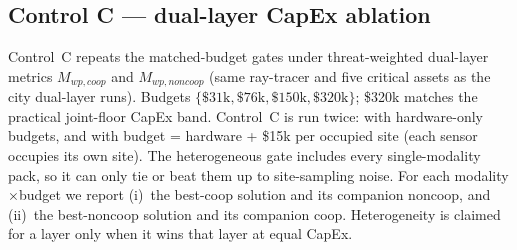 \subsection{Control C --- dual-layer CapEx ablation}
\label{sec:protocol_dual_ablation}

Control~C repeats the matched-budget gates under threat-weighted dual-layer metrics \(M_{wp,coop}\) and \(M_{wp,noncoop}\) (same ray-tracer and five critical assets as the city dual-layer runs). Budgets \(\{\$31\mathrm{k},\$76\mathrm{k},\$150\mathrm{k},\$320\mathrm{k}\}\); \$320k matches the practical joint-floor CapEx band. Control~C is run twice: with hardware-only budgets, and with budget = hardware + \$15k per occupied site (each sensor occupies its own site). The heterogeneous gate includes every single-modality pack, so it can only tie or beat them up to site-sampling noise. For each modality$\times$budget we report (i)~the best-coop solution and its companion noncoop, and (ii)~the best-noncoop solution and its companion coop. Heterogeneity is claimed for a layer only when it wins that layer at equal CapEx.
